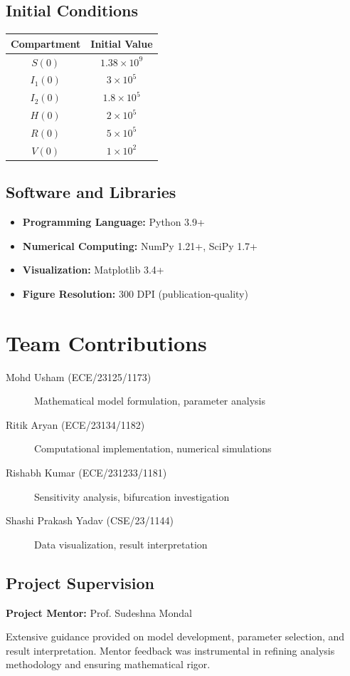 \documentclass[12pt,a4paper]{report}
\begin{document}
\section{Initial Conditions}

\begin{table}[H]
\centering
\begin{tabular}{|c|c|}
\hline
Compartment & Initial Value \\
\hline
$S(0)$ & $1.38 \times 10^9$ \\
$I_1(0)$ & $3 \times 10^5$ \\
$I_2(0)$ & $1.8 \times 10^5$ \\
$H(0)$ & $2 \times 10^5$ \\
$R(0)$ & $5 \times 10^5$ \\
$V(0)$ & $1 \times 10^2$ \\
\hline
\end{tabular}
\end{table}

\section{Software and Libraries}

\begin{itemize}
    \item \textbf{Programming Language:} Python 3.9+
    \item \textbf{Numerical Computing:} NumPy 1.21+, SciPy 1.7+
    \item \textbf{Visualization:} Matplotlib 3.4+
    \item \textbf{Figure Resolution:} 300 DPI (publication-quality)
\end{itemize}

\chapter{Team Contributions}

\begin{description}
    \item[Mohd Usham (ECE/23125/1173)] Mathematical model formulation, parameter analysis
    \item[Ritik Aryan (ECE/23134/1182)] Computational implementation, numerical simulations
    \item[Rishabh Kumar (ECE/231233/1181)] Sensitivity analysis, bifurcation investigation
    \item[Shashi Prakash Yadav (CSE/23/1144)] Data visualization, result interpretation
\end{description}

\section{Project Supervision}

\textbf{Project Mentor:} Prof. Sudeshna Mondal

Extensive guidance provided on model development, parameter selection, and result interpretation. Mentor feedback was instrumental in refining analysis methodology and ensuring mathematical rigor.
\end{document}
